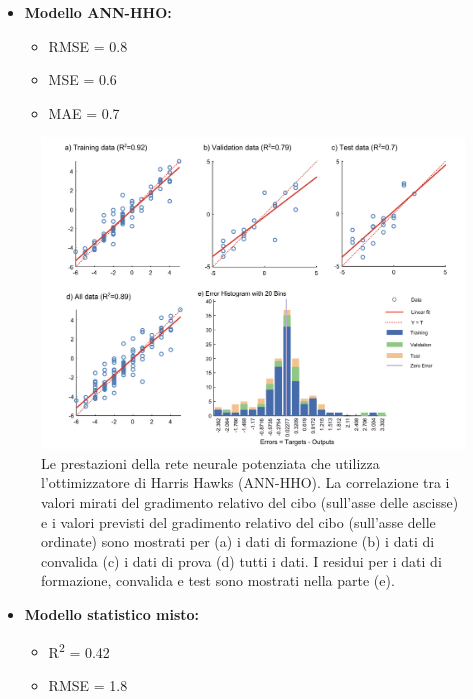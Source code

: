 \newpage
\begin{itemize}
       \item \textbf{Modello ANN-HHO:}
            \begin{itemize}
                  \item RMSE = 0.8
                  \item MSE = 0.6
                  \item MAE = 0.7
            \end{itemize}
\end{itemize}

\begin{figure}[H]
      \captionsetup{font=scriptsize}
      \centering
      \includegraphics[width=1\textwidth]{Chapters/Figures/ann-hho-result.png} 
      \caption{\small Le prestazioni della rete neurale potenziata che utilizza l'ottimizzatore di Harris Hawks (ANN-HHO). La correlazione tra i valori mirati del gradimento relativo del cibo (sull'asse delle ascisse) e i valori previsti del gradimento relativo del cibo (sull'asse delle ordinate) sono mostrati per (a) i dati di formazione (b) i dati di convalida (c) i dati di prova (d) tutti i dati. I residui per i dati di formazione, convalida e test sono mostrati nella parte (e). \cite{alamir2021enhanced}}
      \label{fig:ann-hho-abc}
\end{figure}

\begin{itemize}
      \item \textbf{Modello statistico misto:}
            \begin{itemize}
                  \item R\textsuperscript{2} = 0.42
                  \item RMSE = 1.8
            \end{itemize}
\end{itemize}


